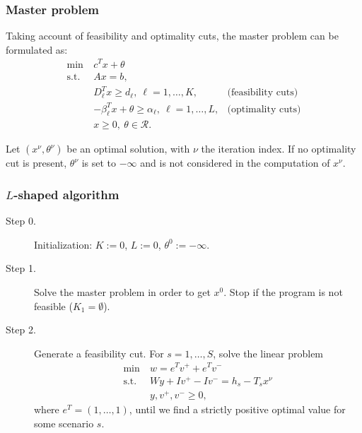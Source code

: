 \documentclass{beamer}
\def\rit{\mathcal{R}}
\begin{document}
\begin{frame}
\frametitle{Master problem}

Taking account of feasibility and optimality cuts, the master problem can be formulated as:
\begin{align*}
\min\ & c^Tx + \theta \\
\mbox{s.t. } & Ax = b, \\
& D_{\ell}^Tx \geq d_{\ell},\ \ell = 1,\ldots,K, & \mbox{(feasibility cuts)} \\
& -\beta_{\ell}^Tx + \theta \geq \alpha_{\ell},\ \ell = 1,\ldots,L, & \mbox{(optimality cuts)}\\
& x \geq 0,\ \theta \in \rit.
\end{align*}
	
\mbox{}

Let $(x^{\nu}, \theta^{\nu})$ be an optimal solution, with $\nu$ the iteration index.
If no optimality cut is present, $\theta^{\nu}$ is set to $-\infty$ and is not considered in the computation of $x^{\nu}$.

\end{frame}

\begin{frame}
\frametitle{$L$-shaped algorithm}
	
\begin{description}
\item[Step 0.]  {\red Initialization}:
$K := 0$, $L:= 0$, $\theta^{0} := -\infty$.
\item[Step 1.] {\red Solve the master problem} in order to get $x^0$.
Stop if the program is not feasible ($K_1 = \emptyset$).
\item[Step 2.]
Generate a {\red feasibility cut}.
For $s = 1,\ldots,S$, solve the linear problem
\begin{align*}
\min\ & w = e^Tv^+ + e^Tv^- \\
\mbox{s.t. } & Wy + Iv^+ - Iv^- = h_s - T_sx^{\nu} \\
& y, v^+, v^- \geq 0,
\end{align*}
where $e^T = (1,\ldots,1)$, until we find a strictly positive optimal value for some scenario $s$.
\end{description}
	
\end{frame}
\end{document}
